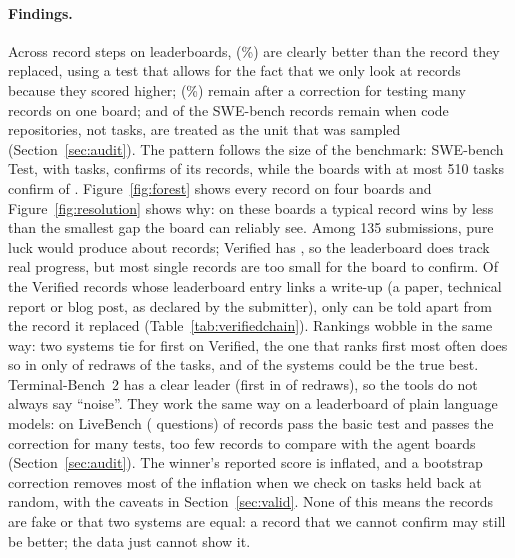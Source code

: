 \documentclass[11pt]{article}
\begin{document}
\paragraph{Findings.}
Across \NumTotalSteps{} record steps on \NumBoardsWithSteps{} leaderboards, \NumTotalSig{} (\NumTotalSigPct\%) are clearly better than the record they replaced, using a test that allows for the fact that we only look at records because they scored higher; \NumTotalHolm{} (\NumTotalHolmPct\%) remain after a correction for testing many records on one board; and \NumClusterSig{} of the \NumClusterSteps{} SWE-bench records remain when code repositories, not tasks, are treated as the unit that was sampled (Section~\ref{sec:audit}).
The pattern follows the size of the benchmark: SWE-bench Test, with \NumTestT{} tasks, confirms \NumTestSig{} of its \NumTestSteps{} records, while the \NumSmallBoards{} boards with at most 510 tasks confirm \NumSmallSig{} of \NumSmallSteps{}.
Figure~\ref{fig:forest} shows every record on four boards and Figure~\ref{fig:resolution} shows why: on these boards a typical record wins by less than the smallest gap the board can reliably see.
Among 135 submissions, pure luck would produce about \NumVerifiedNoiseRecords{} records; Verified has \NumVerifiedSteps{}, so the leaderboard does track real progress, but most single records are too small for the board to confirm.
Of the \NumClaimsReport{} Verified records whose leaderboard entry links a write-up (a paper, technical report or blog post, as declared by the submitter), only \NumClaimsReportSig{} can be told apart from the record it replaced (Table~\ref{tab:verifiedchain}).
Rankings wobble in the same way: two systems tie for first on Verified, the one that ranks first most often does so in only \NumVerifiedPBest{} of redraws of the tasks, and \NumVerifiedSet{} of the \NumVerifiedK{} systems could be the true best.
Terminal-Bench~2 has a clear leader (first in \NumTBPBest{} of redraws), so the tools do not always say ``noise''.
They work the same way on a leaderboard of plain language models: on LiveBench (\NumLBT{} questions) \NumLBSig{} of \NumLBSteps{} records pass the basic test and \NumLBHolm{} passes the correction for many tests, too few records to compare with the agent boards (Section~\ref{sec:audit}).
The winner's reported score is inflated, and a bootstrap correction removes most of the inflation when we check on tasks held back at random, with the caveats in Section~\ref{sec:valid}.
None of this means the records are fake or that two systems are equal: a record that we cannot confirm may still be better; the data just cannot show it.
\end{document}
